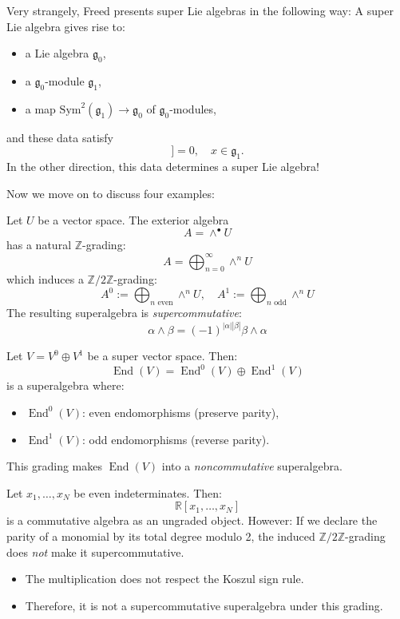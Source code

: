 Very strangely, Freed presents super Lie algebras in the following way: A super Lie algebra gives rise to:
\begin{itemize}
  \item a Lie algebra $\mathfrak{g}_0$,
  \item a $\mathfrak{g}_0$-module $\mathfrak{g}_1$,
  \item a map $\mathrm{Sym}^2(\mathfrak{g}_1) \to \mathfrak{g}_0$ of $\mathfrak{g}_0$-modules,
\end{itemize}
and these data satisfy
\begin{equation*}
[x, [x, x]] = 0, \quad x \in \mathfrak{g}_1.
\end{equation*}
In the other direction, this data determines a super Lie algebra!

Now we move on to discuss four examples:

\begin{example}
    Let $U$ be a vector space. The exterior algebra
\[
A = \wedge^\bullet U
\]
has a natural $\mathbb{Z}$-grading:
\[
A = \bigoplus_{n=0}^\infty \wedge^n U
\]
which induces a $\mathbb{Z}/2\mathbb{Z}$-grading:
\[
A^{0} := \bigoplus_{n \text{ even}} \wedge^n U, \quad
A^{1} := \bigoplus_{n \text{ odd}} \wedge^n U
\]
The resulting superalgebra is \emph{supercommutative}:
\[
\alpha \wedge \beta = (-1)^{|\alpha||\beta|} \beta \wedge \alpha
\]
\end{example}

\begin{example}
    Let $V = V^0 \oplus V^1$ be a super vector space. Then:
\[
\operatorname{End}(V) = \operatorname{End}^0(V) \oplus \operatorname{End}^1(V)
\]
is a superalgebra where:
\begin{itemize}
    \item $\operatorname{End}^0(V)$: even endomorphisms (preserve parity),
    \item $\operatorname{End}^1(V)$: odd endomorphisms (reverse parity).
\end{itemize}
This grading makes $\operatorname{End}(V)$ into a \emph{noncommutative} superalgebra.

\end{example}

\begin{example}
    Let $x_1, \dots, x_N$ be even indeterminates. Then:
\[
\mathbb{R}[x_1, \dots, x_N]
\]
is a commutative algebra as an ungraded object. However: If we declare the parity of a monomial by its total degree modulo 2, the induced $\mathbb{Z}/2\mathbb{Z}$-grading does \emph{not} make it supercommutative.

\begin{itemize}
    \item The multiplication does not respect the Koszul sign rule.
    \item Therefore, it is not a supercommutative superalgebra under this grading.
\end{itemize}
\end{example}

